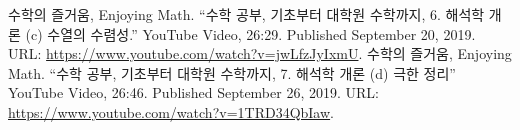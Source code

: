 \documentclass[11pt,openany]{article}
\begin{document}
\vfill
\begin{thebibliography}{9}
	수학의 즐거움, Enjoying Math. ``수학 공부, 기초부터 대학원 수학까지, 6. 해석학 개론 (c) 수열의 수렴성.'' YouTube Video, 26:29. Published 
	September 20, 2019. URL: \url{https://www.youtube.com/watch?v=jwLfzJyIxmU}.
	수학의 즐거움, Enjoying Math. ``수학 공부, 기초부터 대학원 수학까지, 7. 해석학 개론 (d) 극한 정리'' YouTube Video, 26:46. Published 
	September 26, 2019. URL: \url{https://www.youtube.com/watch?v=1TRD34QbIaw}.
\end{thebibliography}

\end{document}

